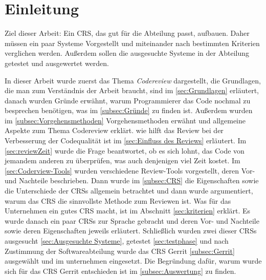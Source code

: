 \newpage

\section{Einleitung}
\label{sec:Einleitung}

Ziel dieser Arbeit: Ein \ac{CRS}, das gut für die Abteilung passt, aufbauen. Daher müssen ein paar Systeme Vorgestellt und miteinander nach bestimmten Kriterien verglichen werden. Außerdem sollen die ausgesuchte Systeme in der Abteilung getestet und ausgewertet werden.

In dieser Arbeit wurde zuerst das Thema \emph{Codereview} dargestellt, die Grundlagen, die man zum Verständnis der Arbeit braucht, sind im \cref{sec:Grundlagen} erläutert, danach wurden Gründe erwähnt, warum Programmierer das Code nochmal zu besprechen benötigen, was im \cref{subsec:Gründe} zu finden ist. Außerdem wurden im \cref{subsec:Vorgehensmethoden} Vorgehensmethoden erwähnt und allgemeine Aspekte zum Thema Codereview erklärt. wie hilft das Review bei der Verbesserung der Codequalität ist im \cref{sec:Einfluss des Reviews} erläutert. Im \cref{sec:reviewZeit} wurde die Frage beantwortet, ob es sich lohnt, das Code von jemandem anderen zu überprüfen, was auch denjenigen viel Zeit kostet.
Im \cref{sec:Coderview-Tools} wurden verschiedene Review-Tools vorgestellt, deren Vor- und Nachteile beschrieben. Dann wurde im \cref{subsec:CRS} die Eigenschaften sowie die Unterschiede der \acp{CRS} allgemein betrachtet und dann wurde argumentiert, warum das \ac{CRS} die sinnvollste Methode zum Reviewen ist. Was für das Unternehmen ein gutes \ac{CRS} macht, ist im Abschnitt \ref{sec:kriterien} erklärt. Es wurde danach ein paar \acp{CRS} zur Sprache gebracht und deren Vor- und Nachteile sowie deren Eigenschaften jeweils erläutert. Schließlich wurden zwei dieser \acp{CRS} ausgesucht \cref{sec:Ausgesuchte Systeme}, getestet \cref{sec:testphase} und nach Zustimmung der Softwareabteilung wurde das \ac{CRS} Gerrit \ref{subsec:Gerrit} ausgewählt und im unternehmen eingesetzt. Die Begründung dafür, warum wurde sich für das \ac{CRS} Gerrit entschieden ist im \cref{subsec:Auswertung} zu finden.